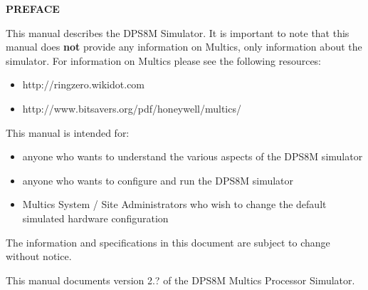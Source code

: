 \begin{center}
\Large\bfseries PREFACE
\end{center}

This manual describes the DPS8M Simulator. It is important to note that this manual 
does \textbf{not} provide any information on Multics, only information about the simulator.
For information on Multics please see the following resources:

\begin{itemize}
	\item http://ringzero.wikidot.com
	\item http://www.bitsavers.org/pdf/honeywell/multics/
\end{itemize} 

This manual is intended for:

\begin{itemize}
	\item anyone who wants to understand the various aspects of the DPS8M simulator
	\item anyone who wants to configure and run the DPS8M simulator
	\item Multics System / Site Administrators who wish to change the default simulated hardware configuration
\end{itemize} 

The information and specifications in this document are subject to change without notice.

This manual documents version 2.? of the DPS8M Multics Processor Simulator.

